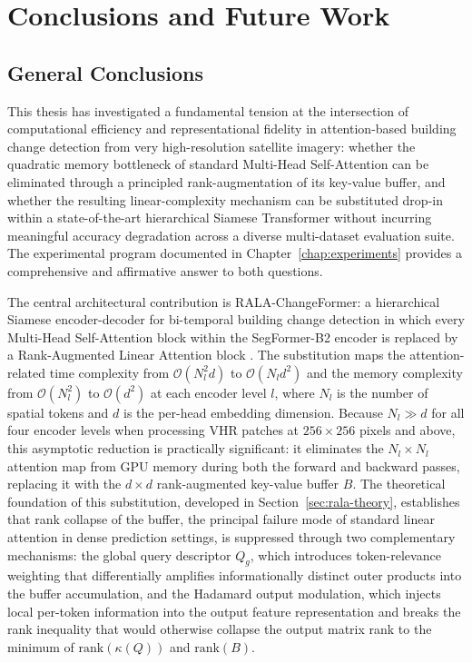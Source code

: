 \chapter{Conclusions and Future Work}
\label{chap:conclusiones}

\section{General Conclusions}
\label{sec:conclusions-general}

This thesis has investigated a fundamental tension at the intersection of computational efficiency and representational fidelity in attention-based building change detection from very high-resolution satellite imagery: whether the quadratic memory bottleneck of standard Multi-Head Self-Attention can be eliminated through a principled rank-augmentation of its key-value buffer, and whether the resulting linear-complexity mechanism can be substituted drop-in within a state-of-the-art hierarchical Siamese Transformer without incurring meaningful accuracy degradation across a diverse multi-dataset evaluation suite. The experimental program documented in Chapter~\ref{chap:experiments} provides a comprehensive and affirmative answer to both questions.

The central architectural contribution is RALA-ChangeFormer: a hierarchical Siamese encoder-decoder for bi-temporal building change detection in which every Multi-Head Self-Attention block within the SegFormer-B2 encoder is replaced by a Rank-Augmented Linear Attention block \cite{Fan2025RALA}. The substitution maps the attention-related time complexity from $\mathcal{O}(N_l^2 d)$ to $\mathcal{O}(N_l d^2)$ and the memory complexity from $\mathcal{O}(N_l^2)$ to $\mathcal{O}(d^2)$ at each encoder level $l$, where $N_l$ is the number of spatial tokens and $d$ is the per-head embedding dimension. Because $N_l \gg d$ for all four encoder levels when processing \ac{VHR} patches at $256 \times 256$ pixels and above, this asymptotic reduction is practically significant: it eliminates the $N_l \times N_l$ attention map from \ac{GPU} memory during both the forward and backward passes, replacing it with the $d \times d$ rank-augmented key-value buffer $B$. The theoretical foundation of this substitution, developed in Section~\ref{sec:rala-theory}, establishes that rank collapse of the buffer, the principal failure mode of standard linear attention in dense prediction settings, is suppressed through two complementary mechanisms: the global query descriptor $Q_g$, which introduces token-relevance weighting that differentially amplifies informationally distinct outer products into the buffer accumulation, and the Hadamard output modulation, which injects local per-token information into the output feature representation and breaks the rank inequality that would otherwise collapse the output matrix rank to the minimum of $\mathrm{rank}(\kappa(Q))$ and $\mathrm{rank}(B)$.

